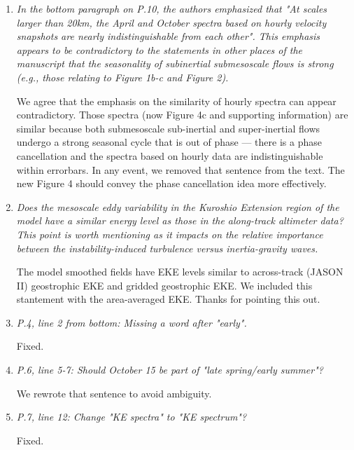 \documentclass[11pt]{article}
\newcommand{\bdp}{\begin{description}}
\newcommand{\edp}{\end{description}}
\begin{document}
\begin{enumerate}


\item {\it In the bottom paragraph on P.10, the authors emphasized that "At scales larger
than 20km, the April and October spectra based on hourly velocity snapshots are
nearly indistinguishable from each other". This emphasis appears to be contradictory
to the statements in other places of the manuscript that the seasonality of subinertial
submesoscale flows is strong (e.g., those relating to Figure 1b-c and Figure 2).}\\

    \bdp
        We agree that the emphasis on the similarity of hourly spectra can appear
        contradictory. Those spectra (now Figure 4c
        and supporting information) are similar because both submesoscale sub-inertial
        and super-inertial flows undergo a strong seasonal cycle that is out of
        phase --- there is a phase cancellation and the spectra based on hourly
        data are indistinguishable within errorbars. In any event, we removed
        that sentence from the text. The new Figure 4 should convey
        the phase cancellation idea more effectively.
    \edp

\item {\it Does the mesoscale eddy variability in the Kuroshio Extension region of the model
have a similar energy level as those in the along-track altimeter data? This point
is worth mentioning as it impacts on the relative importance between the instability-induced
turbulence versus inertia-gravity waves.}

  \bdp
      The model smoothed fields have EKE levels similar to across-track (JASON II)
      geostrophic EKE and gridded geostrophic EKE. We included this stantement with
      the area-averaged EKE. Thanks for pointing this out.
  \edp

\item {\it P.4, line 2 from bottom: Missing a word after "early".}

  Fixed.

\item {\it P.6, line 5-7: Should October 15 be part of "late spring/early summer"?}

  We rewrote that sentence to avoid ambiguity.

\item {\it P.7, line 12: Change "KE spectra" to "KE spectrum"?}

Fixed.


\end{enumerate}
\end{document}
